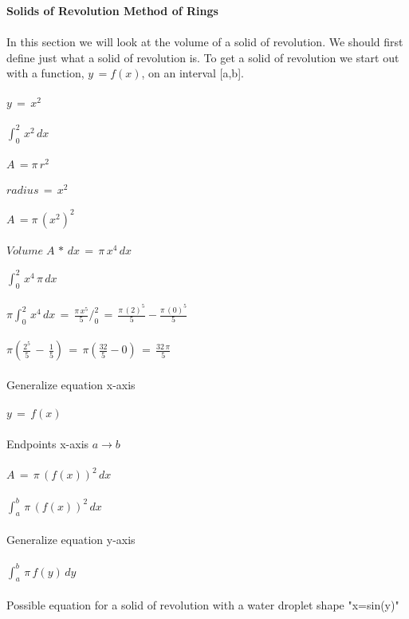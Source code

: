 \documentclass[10pt,a4paper]{report}
\begin{document}
{\bf {Solids of Revolution Method of Rings}}
\\\\In this section we will look at the volume of a solid of revolution. We should first define just what a solid of revolution is. To get a solid of revolution we start out with a function, $y \,= f(x)$, on an interval [a,b].
\\\\ $\displaystyle y \, = \, x^2 $
\\\\ $\displaystyle \int_0^2 \, x^2 \, dx$
\\\\ $\displaystyle A \, = \pi \, r^2 $
\\\\ $\displaystyle radius \, = \, x^2 $
\\\\ $\displaystyle A \, = \pi \, (x^2)^2 $
\\\\ $\displaystyle Volume \; A \, * \, dx \, = \, \pi \, x^4 \,  dx $
\\\\ $\displaystyle \int_0^2 \, x^4 \, \pi \, dx$
\\\\ $\displaystyle \pi \int_0^2 \, x^4 \, dx \, = \, \frac{\pi \, x^5}{5} /_0^2 \, = \, \frac{\pi \, (2)^5}{5} - \frac{\pi \, (0)^5}{5}$
\\\\ $\displaystyle \pi(\frac{2^5}{5} \, - \, \frac{1}{5}) \, = \, \pi(\frac{32}{5}-0) \, = \, \frac{32 \, \pi}{5}$
\\\\Generalize equation x-axis
\\\\ $\displaystyle y \, = \, f(x)$
\\\\ Endpoints x-axis $a \rightarrow b$
\\\\$A \, = \, \pi \, (f(x))^2 \, dx $
\\\\ $\displaystyle \int_a^b \, \pi \, (f(x))^2 \, dx $
\\\\Generalize equation y-axis
\\\\ $\displaystyle \int_a^b \, \pi \, f(y) \, dy $
\\\\ Possible equation for a solid of revolution with a water droplet shape "x=sin(y)"
\end{document}
